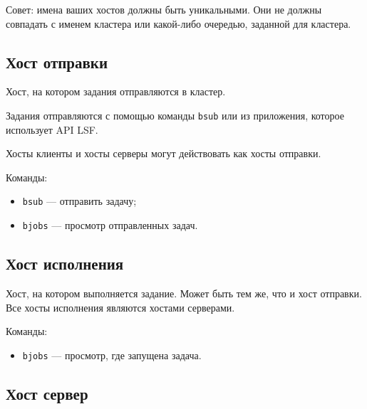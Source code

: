Совет: имена ваших хостов должны быть уникальными. Они не должны совпадать с именем кластера или какой-либо очередью, заданной для кластера.

\subsection{Хост отправки}

Хост, на котором задания отправляются в кластер.

Задания отправляются с помощью команды \lstinline{bsub} или из приложения, которое использует API LSF.

Хосты клиенты и хосты серверы могут действовать как хосты отправки.

Команды:

\begin{itemize}
    \item \lstinline{bsub} --- отправить задачу;
    \item \lstinline{bjobs} --- просмотр отправленных задач.
\end{itemize}

\subsection{Хост исполнения}

Хост, на котором выполняется задание. Может быть тем же, что и хост отправки. Все хосты исполнения являются хостами серверами.

Команды:

\begin{itemize}
    \item \lstinline{bjobs} --- просмотр, где запущена задача.
\end{itemize}

\subsection{Хост сервер}


